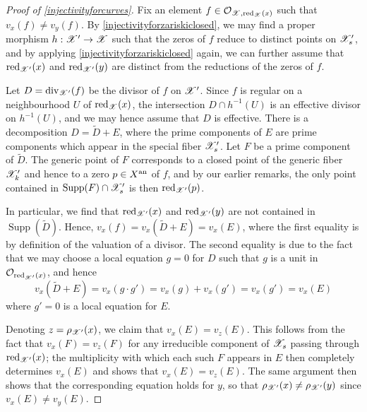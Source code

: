\begin{proof}[Proof of \cref{injectivityforcurves}]
    Fix an element $f \in \mathcal{O}_{\mathscr{X}, \operatorname{red}_{\mathscr{X}}(x)}$ such that $v_x(f) \neq v_y(f)$.
    By \cref{injectivityforzariskiclosed}, we may find a proper morphism $h: \mathscr{X}' \to \mathscr{X}$ such that the zeros of $f$ reduce to distinct points on $\mathscr{X}'_s$, and by applying \cref{injectivityforzariskiclosed} again, we can further assume that $\operatorname{red}_{\mathscr{X}'}(x)$ and $\operatorname{red}_{\mathscr{X}'}(y)$ are distinct from the reductions of the zeros of $f$.
    
    Let $D = \operatorname{div}_{\mathscr{X}'}(f)$ be the divisor of $f$ on $\mathscr{X}'$.
    Since $f$ is regular on a neighbourhood $U$ of $\operatorname{red}_{\mathscr{X}}(x)$, the intersection $D \cap h^{-1}(U)$ is an effective divisor on $h^{-1}(U)$, and we may hence assume that $D$ is effective.
    There is a decomposition $D = \tilde{D} + E$, where the prime components of $E$ are prime components which appear in the special fiber $\mathscr{X}'_s$.
    Let $F$ be a prime component of $\tilde{D}$.
    The generic point of $F$ corresponds to a closed point of the generic fiber $\mathscr{X}'_k$ and hence to a zero $p \in X^{\text{an}}$ of $f$, and by our earlier remarks, the only point contained in $\operatorname{Supp}(F) \cap \mathscr{X}'_s$ is then $\operatorname{red}_{\mathscr{X}'}(p)$.
    
    In particular, we find that $\operatorname{red}_{\mathscr{X}'}(x)$ and $\operatorname{red}_{\mathscr{X}'}(y)$ are not contained in $\operatorname{Supp}(\tilde{D})$.
    Hence, $v_x(f) = v_x(\tilde{D} + E) = v_x(E)$, where the first equality is by definition of the valuation of a divisor.
    The second equality is due to the fact that we may choose a local equation $g = 0$ for $D$ such that $g$ is a unit in $\mathcal{O}_{\operatorname{red}_{\mathscr{X}'}(x)}$, and hence 
    \[v_x(\tilde{D} + E) = v_x(g \cdot g') = v_x(g) + v_x(g') = v_x(g') = v_x(E)\]
    where $g' = 0$ is a local equation for $E$.
    
    Denoting $z = \rho_{\mathscr{X}'}(x)$, we claim that $v_x(E) = v_z(E)$. 
    This follows from the fact that $v_x(F) = v_z(F)$ for any irreducible component of $\mathscr{X}_s$ passing through $\operatorname{red}_{\mathscr{X}'}(x)$; the multiplicity with which each such $F$ appears in $E$ then completely determines $v_x(E)$ and shows that $v_x(E) = v_z(E)$.
    The same argument then shows that the corresponding equation holds for $y$, so that $\rho_{\mathscr{X}'}(x) \neq \rho_{\mathscr{X}'}(y)$ since $v_x(E) \neq v_y(E)$.
\end{proof}

